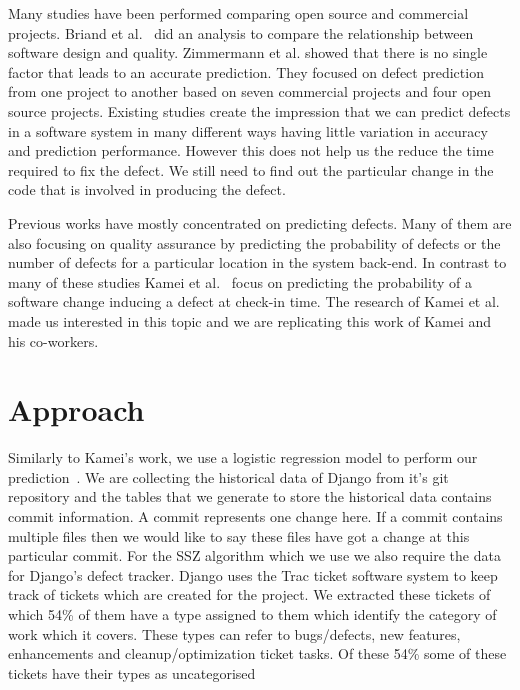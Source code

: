 \documentclass[10pt, conference]{IEEEtran}
\begin{document}
Many studies have been performed comparing open source and commercial projects. Briand et al.~\cite{Briand1999ICSE} did an analysis to compare the relationship between software design and quality. Zimmermann et al.\cite{Zimmermann2009ESECS} showed that there is no single factor that leads to an accurate prediction. They focused on defect prediction from one project to another based on seven commercial projects and four open source projects. Existing studies create the impression that we can predict defects in a software system in many different ways having little variation in accuracy and prediction performance. However this does not help us the reduce the  time required to fix the defect. We still need to find out the particular change in the code that is involved in producing the defect.

Previous works have mostly concentrated on predicting defects. Many of them are also focusing on quality assurance by predicting the probability of defects or the number of defects for a particular location in the system back-end. In contrast to many of these studies Kamei et al.~\cite{Kamei2013TSE} focus on predicting the probability of a software change inducing a defect at check-in time. The research of Kamei et al. made us interested in this topic and we are replicating this work of Kamei and his co-workers.

\section{Approach}
\label{sec:approach}



Similarly to Kamei's work, we use a logistic regression model to perform our prediction~\cite{Kamei2013TSE}. We are collecting the historical data of Django from it's git repository and the tables that we generate to store the historical data contains commit information. A commit represents one change here. If a commit contains multiple files then we would like to say these files have got a change at this particular commit. For the SSZ algorithm which we use we also require the data for Django's defect tracker. Django uses the Trac ticket software system to keep track of tickets which are created for the project. We extracted these tickets of which 54\% of them have a type assigned to them which identify the category of work which it covers. These types can refer to bugs/defects, new features, enhancements and cleanup/optimization ticket tasks. Of these 54\% some of these tickets have their types as uncategorised  
\end{document}
